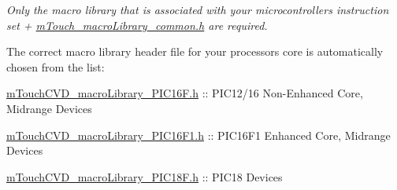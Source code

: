 {\itshape Only the macro library that is associated with your microcontroller\textquotesingle{}s instruction set + \hyperlink{m_touch__macro_library__common_8h}{m\+Touch\+\_\+macro\+Library\+\_\+common.\+h} are required.}

The correct macro library header file for your processor\textquotesingle{}s core is automatically chosen from the list\+: \begin{DoxyItemize}
\item \hyperlink{m_touch_c_v_d__macro_library___p_i_c16_f_8h}{m\+Touch\+C\+V\+D\+\_\+macro\+Library\+\_\+\+P\+I\+C16\+F.\+h} \+:\+: P\+I\+C12/16 Non-\/\+Enhanced Core, Midrange Devices \item \hyperlink{m_touch_c_v_d__macro_library___p_i_c16_f1_8h}{m\+Touch\+C\+V\+D\+\_\+macro\+Library\+\_\+\+P\+I\+C16\+F1.\+h} \+:\+: P\+I\+C16\+F1 Enhanced Core, Midrange Devices \item \hyperlink{m_touch_c_v_d__macro_library___p_i_c18_f_8h}{m\+Touch\+C\+V\+D\+\_\+macro\+Library\+\_\+\+P\+I\+C18\+F.\+h} \+:\+: P\+I\+C18 Devices \end{DoxyItemize}
